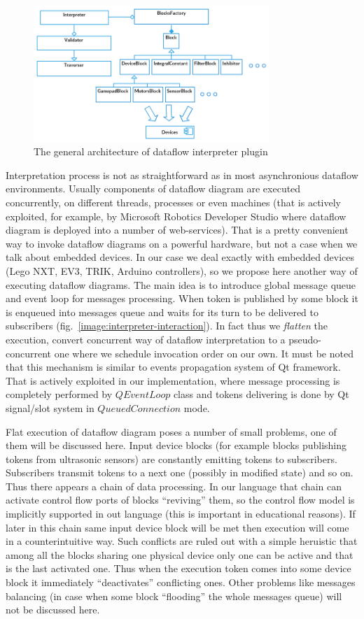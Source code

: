 \documentclass[conference,compsoc]{IEEEtran}
\begin{document}
\begin{figure}[ht]
	\centering
	\includegraphics[width=3.5in]{Interpreter.png}
	\caption{The general architecture of dataflow interpreter plugin}
	\label{image:interpreter-architecture}
\end{figure}

Interpretation process is not as straightforward as in most asynchronious dataflow environments. Usually components of dataflow diagram are executed concurrently, on different threads, processes or even machines (that is actively exploited, for example, by Microsoft Robotics Developer Studio where dataflow diagram is deployed into a number of web-services). That is a pretty convenient way to invoke dataflow diagrams on a powerful hardware, but not a case when we talk about embedded devices. In our case we deal exactly with embedded devices (Lego NXT, EV3, TRIK, Arduino controllers), so we propose here another way of executing dataflow diagrams. The main idea is to introduce global message queue and event loop for messages processing. When token is published by some block it is enqueued into messages queue and waits for its turn to be delivered to subscribers (fig.~\ref{image:interpreter-interaction}). In fact thus we \textit{flatten} the execution, convert concurrent way of dataflow interpretation to a pseudo-concurrent one where we schedule invocation order on our own. It must be noted that this mechanism is similar to events propagation system of Qt framework. That is actively exploited in our implementation, where message processing is completely performed by $QEventLoop$ class and tokens delivering is done by Qt signal/slot system in $QueuedConnection$ mode. 

Flat execution of dataflow diagram poses a number of small problems, one of them will be discussed here. Input device blocks (for example blocks publishing tokens from ultrasonic sensors) are constantly emitting tokens to subscribers. Subscribers transmit tokens to a next one (possibly in modified state) and so on. Thus there appears a chain of data processing. In our language that chain can activate control flow ports of blocks ``reviving'' them, so the control flow model is implicitly supported in out language (this is important in educational reasons). If later in this chain same input device block will be met then execution will come in a 
counterintuitive way. Such conflicts are ruled out with a simple heruistic that among all the blocks sharing one physical device only one can be active and that is the last activated one. Thus when the execution token comes into some device block it immediately ``deactivates'' conflicting ones. Other problems like messages balancing (in case when some block ``flooding'' the whole messages queue) will not be discussed here.
\end{document}
